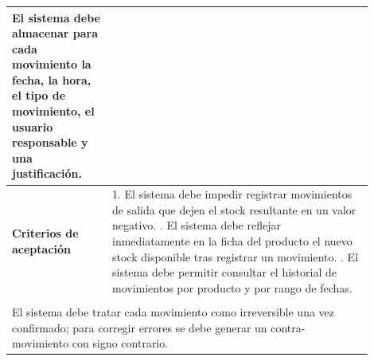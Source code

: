 \begin{longtable}{|p{0.25\linewidth}|p{0.15\linewidth}|p{0.15\linewidth}|p{0.35\linewidth}|}
{		El sistema debe almacenar para cada movimiento la fecha, la hora, el tipo de movimiento, el usuario responsable y una justificación.}                                                                                 \\ \hline
		\cellcolor{tableheaderblue}\textbf{Criterios de aceptación} & \multicolumn{3}{p{0.70\linewidth}|}{                                                                                                                    %
			1. El sistema debe impedir registrar movimientos de salida que dejen el stock resultante en un valor negativo. \newline
			2. El sistema debe reflejar inmediatamente en la ficha del producto el nuevo stock disponible tras registrar un movimiento. \newline
		3. El sistema debe permitir consultar el historial de movimientos por producto y por rango de fechas.}                                                                                                                \\ \hline
		\rowcolor{tableheaderblue}
		\multicolumn{4}{|l|}{\textbf{Restricciones}}                                                                                                                                                                          \\ \hline
		\multicolumn{4}{|p{0.96\linewidth}|}{%
		El sistema debe tratar cada movimiento como irreversible una vez confirmado; para corregir errores se debe generar un contra-movimiento con signo contrario.}                                                         \\ \hline
	
\end{longtable}
\endgroup


